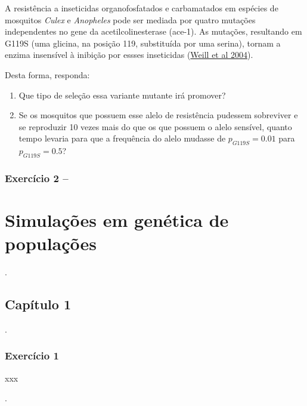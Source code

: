 \documentclass[
]{book}
\begin{document}
A resistência a inseticidas organofosfatados e carbamatados em espécies de mosquitos \emph{Culex} e \emph{Anopheles} pode ser mediada por quatro mutações independentes no gene da acetilcolinesterase (ace-1). As mutações, resultando em G119S (uma glicina, na posição 119, substituída por uma serina), tornam a enzima insensível à inibição por essses inseticidas (\href{https://doi.org/10.1111/j.1365-2583.2004.00452.x}{Weill et al 2004}).

Desta forma, responda:

\begin{enumerate}
\def\labelenumi{\alph{enumi}.}
\item
  Que tipo de seleção essa variante mutante irá promover?
\item
  Se os mosquitos que possuem esse alelo de resistência pudessem sobreviver e se reproduzir 10 vezes mais do que os que possuem o alelo sensível, quanto tempo levaria para que a frequência do alelo mudasse de \(p_{G119S} = 0.01\) para \(p_{G119S} = 0.5\)?
\end{enumerate}

\hypertarget{exercuxedcio-2}{%
\subsection{Exercício 2 --}\label{exercuxedcio-2}}

\hypertarget{simulauxe7uxf5es-em-genuxe9tica-de-populauxe7uxf5es}{%
\chapter{Simulações em genética de populações}\label{simulauxe7uxf5es-em-genuxe9tica-de-populauxe7uxf5es}}

.\linebreak

\hypertarget{capuxedtulo-1}{%
\section{Capítulo 1}\label{capuxedtulo-1}}

.\linebreak

\hypertarget{exercuxedcio-1-1}{%
\subsection{Exercício 1}\label{exercuxedcio-1-1}}

xxx

.\linebreak
\end{document}
